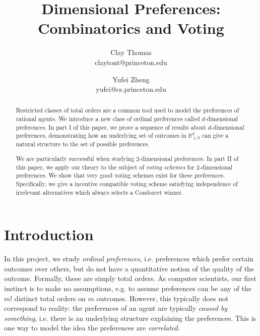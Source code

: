 \documentclass[12pt]{article}
\newcommand{\Rgz}{\mathbb{R}_{\ge 0}}
\newcommand{\1}[1]{\mathds{1}[{#1}]}
\begin{document}
 
\title{
  Dimensional Preferences: Combinatorics and Voting
}
\author{
  Clay Thomas \\
  claytont@princeton.edu
\and
  Yufei Zheng\\
  yufei@cs.princeton.edu
}

\maketitle
\begin{abstract}
  Restricted classes of total orders
  are a common tool used to model the preferences of rational agents.
  We introduce a new class of ordinal preferences called 
  $d$-dimensional preferences.
  In part I of this paper,
  we prove a sequence of results about $d$-dimensional preferences,
  demonstrating how an underlying set of outcomes in $\Rgz^d$
  can give a natural structure to the set of possible preferences.

  We are particularly successful when studying $2$-dimensional preferences.
  In part II of this paper, we apply our theory to the subject of
  \emph{voting schemes} for $2$-dimensional preferences.
  We show that very good voting schemes exist for these preferences.
  Specifically, we give a incentive compatible voting scheme satisfying
  independence of irrelevant alternatives which always selects a Condorcet
  winner.

\end{abstract}

\section{Introduction}

  In this project, we study \emph{ordinal preferences}, i.e. preferences which
  prefer certain outcomes over others, but do not have a quantitative notion of
  the quality of the outcome. Formally, these are simply total orders.
  As computer scientists, our first instinct is to make no assumptions,
  e.g. to assume preferences can be any of the $m!$ distinct total orders
  on $m$ outcomes.
  However, this typically does not correspond to reality: the preferences of an
  agent are typically \emph{caused by something}, i.e. there is an underlying
  structure explaining the preferences. This is one way to model the idea the
  preferences are \emph{correlated}.
\end{document}
